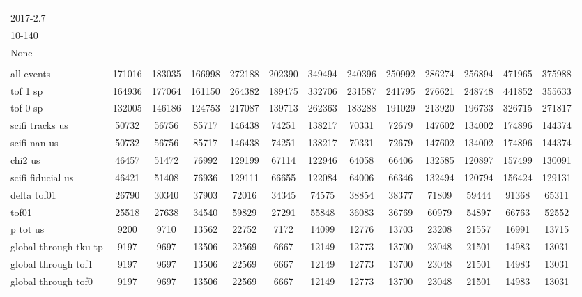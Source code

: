 \begin{landscape}
\begin{table}
\begin{tabular}[pos]{l|cccccccccccc}
\splitcell{\\2017-2.7\\10-140\\None\\} \\
\hline
all events            &  171016  &  183035  &  166998  &  272188  &  202390  &  349494  &  240396  &  250992  &  286274  &  256894  &  471965  &  375988  \\
\hline
tof 1 sp              &  164936  &  177064  &  161150  &  264382  &  189475  &  332706  &  231587  &  241795  &  276621  &  248748  &  441852  &  355633  \\
tof 0 sp              &  132005  &  146186  &  124753  &  217087  &  139713  &  262363  &  183288  &  191029  &  213920  &  196733  &  326715  &  271817  \\
scifi tracks us       &  50732  &  56756  &  85717  &  146438  &  74251  &  138217  &  70331  &  72679  &  147602  &  134002  &  174896  &  144374  \\
scifi nan us          &  50732  &  56756  &  85717  &  146438  &  74251  &  138217  &  70331  &  72679  &  147602  &  134002  &  174896  &  144374  \\
chi2 us               &  46457  &  51472  &  76992  &  129199  &  67114  &  122946  &  64058  &  66406  &  132585  &  120897  &  157499  &  130091  \\
scifi fiducial us     &  46421  &  51408  &  76936  &  129111  &  66655  &  122084  &  64006  &  66346  &  132494  &  120794  &  156424  &  129131  \\
\hline
delta tof01           &  26790  &  30340  &  37903  &  72016  &  34345  &  74575  &  38854  &  38377  &  71809  &  59444  &  91368  &  65311  \\
tof01                 &  25518  &  27638  &  34540  &  59829  &  27291  &  55848  &  36083  &  36769  &  60979  &  54897  &  66763  &  52552  \\
p tot us              &  9200  &  9710  &  13562  &  22752  &  7172  &  14099  &  12776  &  13703  &  23208  &  21557  &  16991  &  13715  \\
\hline
global through tku tp  &  9197  &  9697  &  13506  &  22569  &  6667  &  12149  &  12773  &  13700  &  23048  &  21501  &  14983  &  13031  \\
global through tof1   &  9197  &  9697  &  13506  &  22569  &  6667  &  12149  &  12773  &  13700  &  23048  &  21501  &  14983  &  13031  \\
global through tof0   &  9197  &  9697  &  13506  &  22569  &  6667  &  12149  &  12773  &  13700  &  23048  &  21501  &  14983  &  13031  \\

\end{tabular}
\end{table}
\end{landscape}
